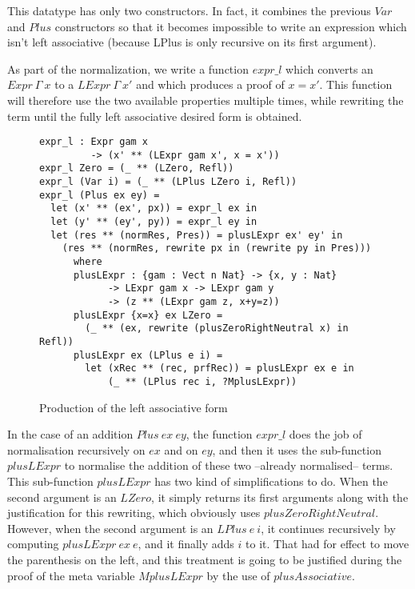 This datatype has only two constructors. In fact, it combines the previous $Var$ and $Plus$ constructors so that it becomes impossible to write an expression which isn't left associative (because LPlus is only recursive on its first argument).
 
As part of the normalization, we write a function $expr\_l$ which converts an $Expr\ \Gamma\ x$ to a $LExpr\ \Gamma\ x'$ and which produces a proof of $x=x'$. This function will therefore use the two available properties multiple times, while rewriting the term until the fully left associative desired form is obtained.

\begin{figure}[H]
\figrule
\begin{center}
\begin{verbatim}
expr_l : Expr gam x 
         -> (x' ** (LExpr gam x', x = x'))
expr_l Zero = (_ ** (LZero, Refl))
expr_l (Var i) = (_ ** (LPlus LZero i, Refl))
expr_l (Plus ex ey) = 
  let (x' ** (ex', px)) = expr_l ex in
  let (y' ** (ey', py)) = expr_l ey in
  let (res ** (normRes, Pres)) = plusLExpr ex' ey' in
    (res ** (normRes, rewrite px in (rewrite py in Pres)))
      where 
      plusLExpr : {gam : Vect n Nat} -> {x, y : Nat} 
            -> LExpr gam x -> LExpr gam y  
            -> (z ** (LExpr gam z, x+y=z))
      plusLExpr {x=x} ex LZero =
        (_ ** (ex, rewrite (plusZeroRightNeutral x) in Refl))            
      plusLExpr ex (LPlus e i) =
        let (xRec ** (rec, prfRec)) = plusLExpr ex e in
            (_ ** (LPlus rec i, ?MplusLExpr))

\end{verbatim}
\end{center}
\caption{Production of the left associative form}
\figrule
\end{figure}
In the case of an addition $Plus\ ex\ ey$, the function $expr\_l$ does the job of normalisation recursively on $ex$ and on $ey$, and then it uses the sub-function $plusLExpr$ to normalise the addition of these two --already normalised-- terms. This sub-function $plusLExpr$ has two kind of simplifications to do. When the second argument is an $LZero$, it simply returns its first arguments along with the justification for this rewriting, which obviously uses $plusZeroRightNeutral$. However, when the second argument is an $LPlus\ e\ i$, it continues recursively by computing $plusLExpr\ ex\ e$, and it finally adds $i$ to it. That had for effect to move the parenthesis on the left, and this treatment is going to be justified during the proof of the meta variable $MplusLExpr$ by the use of $plusAssociative$.

